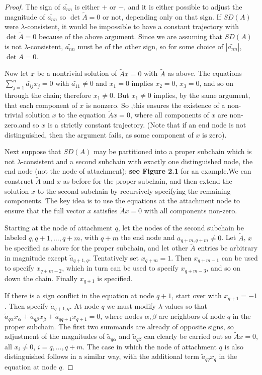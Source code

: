\begin{proof}
	
	The sign of $\tilde{a_{nn}}$ is either $+$ or $-$, and it is either possible to adjust the magnitude of $\tilde{a_{nn}}$ so $\det \tilde{A} = 0$ or not, depending only on that sign. If $SD(A)$ were $\lambda$-consistent, it would be impossible to have a constant trajectory with $\det \tilde{A} = 0$ because of the above argument. Since we are assuming that $SD(A)$ is not $\lambda$-consistent, $\tilde{a_{nn}}$ must be of the other sign, so for some choice of $|\tilde{a_{nn}}|$, $\det A = 0$.
	
	Now let $x$ be a nontrivial solution of $\tilde{A}x = 0$ with $\tilde{A}$ as above. The equations $\sum_{j=1}^n \tilde{a_{ij}}x_j = 0$ with $\tilde{a_{11}} \neq 0$ and $x_1 = 0$ implies $x_2 = 0$, $x_3 = 0$, and so on through the chain; therefore $x_1 \neq 0$. But $x_1 \neq 0$ implies, by the same argument, that each component of $x$ is nonzero. So ,this ensures the existence of a non-trivial solution $x$ to the equation $\tilde{A}x = 0$, where all components of $x$ are non-zero.and so $x$ is a strictly constant trajectory. (Note that if an end node is not distinguished, then the argument fails, as some component of $x$ is zero).
	
	Next suppose that $SD(A)$ may be partitioned into a proper subchain which is not $\lambda$-consistent and a second subchain with exactly one distinguished node, the end node (not the node of attachment); \textbf{see Figure 2.1} for an example.We can construct $\tilde{A}$ and $x$ as before for the proper subchain, and then extend the solution $x$ to the second subchain by recursively specifying the remaining components. The key idea is to use the equations at the attachment node to ensure that the full vector $x$ satisfies $\tilde{A}x = 0$ with all components non-zero.
	
	Starting at the node of attachment $q$, let the nodes of the second subchain be labeled $q,q+1,\ldots, q+m$, with $q+m$ the end node and $a_{q+m,q+m} \neq 0$. Let $\tilde{A}$, $x$ be specified as above for the proper subchain, and let other $\tilde{A}$ entries be arbitrary in magnitude except $\tilde{a}_{q+1,q}$. Tentatively set $x_{q+m} = 1$. Then $x_{q+m-1}$ can be used to specify $x_{q+m-2}$, which in turn can be used to specify $x_{q+m-3}$, and so on down the chain. Finally $x_{q+1}$ is specified.
	
	If there is a sign conflict in the equation at node $q+1$, start over with $x_{q+1} = -1$. Then specify $\tilde{a}_{q+1,q}$. At node $q$ we must modify $\lambda$-values so that $\tilde{a}_{q\alpha}x_{\alpha}+ \tilde{a}_{q\beta}x_{\beta} +\tilde{a}_{qq+1}x_{q+1}  = 0$, where nodes $\alpha,\beta$ are neighbors of node $q$ in the proper subchain. The first two summands are already of opposite signs, so adjustment of the magnitudes of $\tilde{a}_{q\alpha}$ and $\tilde{a}_{q\beta}$ can clearly be carried out so $\tilde{A}x = 0$, all $x_i \neq 0$, $i=q,\ldots,q+m$. The case in which the node of attachment $q$ is also distinguished follows in a similar way, with the additional term $\tilde{a}_{qq}x_q$ in the equation at node $q$.
	

\end{proof}

